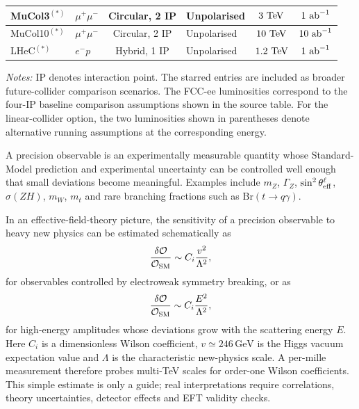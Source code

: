 \documentclass[11pt,a4paper]{report}
\newcommand{\br}{\mathrm{Br}}
\newcommand{\GeV}{\,\mathrm{GeV}}
\begin{document}
\begin{table}[t]
\begin{tabular}{llclcc}
\midrule
		
MuCol3$^{(*)}$
& $\mu^+\mu^-$
& Circular, 2 IP
& Unpolarised
& $3~{\rm TeV}$
& $1~{\rm ab}^{-1}$ \\
		
\midrule
		
MuCol10$^{(*)}$
& $\mu^+\mu^-$
& Circular, 2 IP
& Unpolarised
& $10~{\rm TeV}$
& $10~{\rm ab}^{-1}$ \\
		
\midrule
		
LHeC$^{(*)}$
& $e^-p$
& Hybrid, 1 IP
& Unpolarised
& $1.2~{\rm TeV}$
& $1~{\rm ab}^{-1}$ \\
		
\bottomrule
\end{tabular}

\vspace{0.15cm}
	
\begin{minipage}{0.94\textwidth}
\footnotesize
\textit{Notes:} IP denotes interaction point. 
The starred entries are included as broader future-collider comparison scenarios. 
The FCC-ee luminosities correspond to the four-IP baseline comparison assumptions shown in the source table. 
For the linear-collider option, the two luminosities shown in parentheses denote alternative running assumptions at the corresponding energy.
\end{minipage}
\end{table}






\begin{definitionbox}
	
A precision observable is an experimentally measurable quantity whose Standard-Model prediction and experimental uncertainty can be controlled well enough that small deviations become meaningful.  Examples include $m_Z$, $\Gamma_Z$, $\sin^2\theta_{\rm eff}^\ell$, $\sigma(ZH)$, $m_W$, $m_t$ and rare branching fractions such as $\br(t\to q\gamma)$.

\end{definitionbox}

In an effective-field-theory picture, the sensitivity of a precision observable to heavy new physics can be estimated schematically as
\begin{equation}
  \frac{\delta\mathcal O}{\mathcal O_{\rm SM}}
  \sim C_i\frac{v^2}{\Lambda^2},
  \label{eq:v2scale}
\end{equation}
for observables controlled by electroweak symmetry breaking, or as
\begin{equation}
  \frac{\delta\mathcal O}{\mathcal O_{\rm SM}}
  \sim C_i\frac{E^2}{\Lambda^2},
  \label{eq:e2scale}
\end{equation}
for high-energy amplitudes whose deviations grow with the scattering energy $E$.  Here $C_i$ is a dimensionless Wilson coefficient, $v\simeq246\GeV$ is the Higgs vacuum expectation value and $\Lambda$ is the characteristic new-physics scale.  A per-mille measurement therefore probes multi-TeV scales for order-one Wilson coefficients.  This simple estimate is only a guide; real interpretations require correlations, theory uncertainties, detector effects and EFT validity checks.
\end{document}

